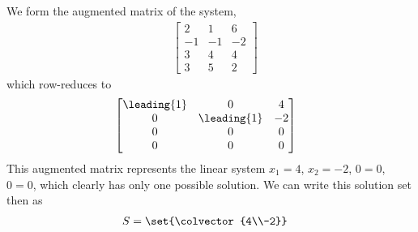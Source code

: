 We form the augmented matrix of the system, 
\begin{align*}
&\begin{bmatrix}
 2 & 1 & 6 \\
 -1 & -1 & -2 \\
 3 & 4 & 4 \\
 3 & 5 & 2
\end{bmatrix}
\end{align*}
which row-reduces to
\begin{align*}
&\begin{bmatrix}
 \leading{1} & 0 & 4 \\
 0 & \leading{1} & -2 \\
 0 & 0 & 0 \\
 0 & 0 & 0
\end{bmatrix}
\end{align*}
%
This augmented matrix represents the linear system $x_1=4$, $x_2=-2$, $0=0$, $0=0$, which clearly has only one possible solution.  We can write this solution set then as
%
\begin{align*}
S&=\set{\colvector{4\\-2}}
\end{align*}
